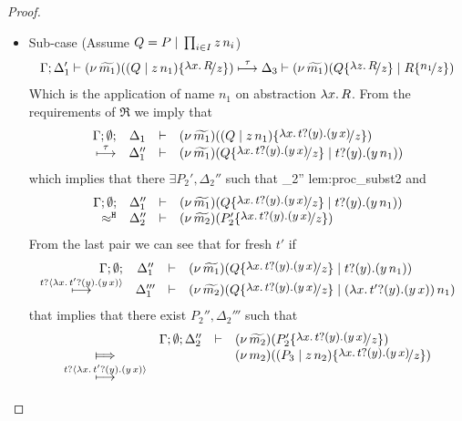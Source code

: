 \begin{proof}
\begin{enumerate}
\begin{itemize}
					\item	Sub-case (Assume $Q = P \;|\; \prod_{i \in I} z\, {n_i}$)
							\begin{eqnarray}
								\horel{\Gamma}{\Delta_1'}{\newsp{\widetilde{m_1}}{(Q \Par \appl{z}{n_1}) \subst{{\abs{x}{R}}}{z} }}
								{\hby{\tau}}
								{\Delta_3}{\newsp{\widetilde{m_1}}{Q \subst{{\abs{z}{R}}}{z} \Par R \subst{n_1}{z}  }}
								\label{lem:proc_subst1}
							\end{eqnarray}
							Which is the application of name $n_1$ on abstraction $\lambda x.\,R$.
							From the requirements of $\Re$ we imply that
							\begin{eqnarray*}
								\mhorel{\Gamma}{\Delta_1}{\newsp{\widetilde{m_1}}{(Q \Par \appl{z}{n_1}) \subst{\trvalx{t}}{z} }}
								{\hby{\tau}}
								{\Delta_1''}{}{\newsp{\widetilde{m_1}}{Q \subst{\trvalx{t}}{z} \Par \binp{t}{y} (\appl{y}{n_1})}}
							\end{eqnarray*}
							which implies that there $\exists P_2', \Delta_2''$ such that
								{\Hby{}}
								{\Delta_2''}{}
								{lem:proc_subst2}
							and
							\begin{eqnarray*}
								\mhorel{\Gamma}{\Delta_1''}{\newsp{\widetilde{m_1}}{Q \subst{\trvalx{t}}{z} \Par \binp{t}{y} (\appl{y}{n_1})}}
								{\hwb}
								{\Delta_2''}{}{\newsp{\widetilde{m_2}}{P_2' \subst{\trvalx{t}}{z}}}
							\end{eqnarray*}
							From the last pair we can see that for fresh $t'$ if
							\begin{eqnarray*}
								\mhorel{\Gamma}{\Delta_1''}{\newsp{\widetilde{m_1}}{Q \subst{\trvalx{t}}{z} \Par \binp{t}{y} (\appl{y}{n_1})}}
								{\hby{\bactinp{t}{\trvalx{t'}}}}
								{\Delta_1'''}{}{\newsp{\widetilde{m_2}}{Q \subst{\trvalx{t}}{z} \Par \appl{(\trvalx{t'})}{n_1}}}
							\end{eqnarray*}
							that implies that there exist $P_2'', \Delta_2'''$ such that
							\begin{eqnarray}
								\begin{array}{crll}
											& \Gamma; \es; \Delta_2'' &\proves& \newsp{\widetilde{m_2}}{P_2'\subst{\trvalx{t}}{z}}
									\\
									\Hby{}	&	&&	\newsp{m_2}{(P_3 \Par \appl{z}{n_2}) \subst{\trvalx{t}}{z}}
									\\
									{\hby{\bactinp{t}{\trvalx{t'}}}} &

\end{array}
\end{eqnarray}
\end{itemize}
\end{enumerate}
\end{proof}
